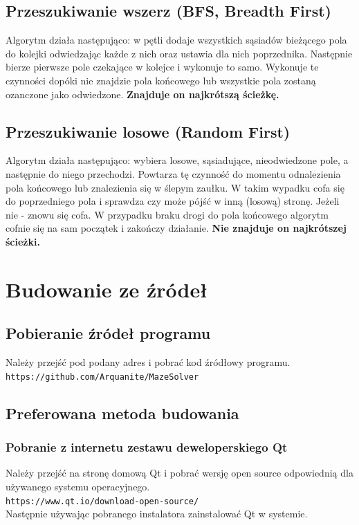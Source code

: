 \documentclass[12pt,a4paper]{article}
\begin{document}
	\subsection{Przeszukiwanie wszerz (BFS, Breadth First)}
	Algorytm działa następująco: w pętli dodaje wszystkich sąsiadów 
	bieżącego pola do kolejki odwiedzając każde z nich oraz ustawia 
	dla nich poprzednika. Następnie bierze pierwsze pole czekające w 
	kolejce i wykonuje to samo. Wykonuje te czynności dopóki nie 
	znajdzie pola końcowego lub wszystkie pola zostaną ozanczone jako 
	odwiedzone.
	\textbf{Znajduje on najkrótszą ścieżkę.}
	
	\subsection{Przeszukiwanie losowe (Random First)}
	Algorytm działa następująco: wybiera losowe, sąsiadujące, nieodwiedzone pole,
	a następnie do niego przechodzi. Powtarza tę czynność do momentu
	odnalezienia pola końcowego lub znalezienia się w ślepym zaułku. W 
	takim wypadku cofa się do poprzedniego pola i sprawdza czy może
	pójść w inną (losową) stronę. Jeżeli nie - znowu się cofa. W 
	przypadku braku drogi do pola końcowego algorytm cofnie się na sam 
	początek i zakończy działanie. \textbf{Nie znajduje on najkrótszej 
	ścieżki.}
	
	\section{Budowanie ze źródeł}

	\subsection{Pobieranie źródeł programu}
	Należy przejść pod podany adres i pobrać kod źródłowy programu.\\
	\texttt{https://github.com/Arquanite/MazeSolver}
	\subsection{Preferowana metoda budowania}

	\subsubsection{Pobranie z internetu zestawu deweloperskiego Qt}
	Należy przejść na stronę domową Qt i pobrać wersję open source odpowiednią
	dla używanego systemu operacyjnego.\\
	\texttt{https://www.qt.io/download-open-source/}\\
	Następnie używając pobranego instalatora zainstalować Qt w systemie.	
\end{document}
